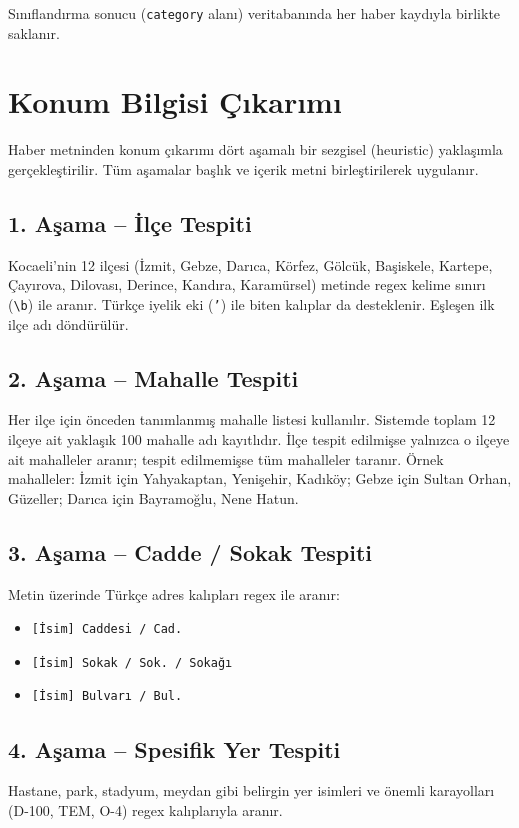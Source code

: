 \documentclass[conference,a4paper]{IEEEtran}
\begin{document}
Sınıflandırma sonucu (\texttt{category} alanı) veritabanında her haber kaydıyla birlikte saklanır.

\section{Konum Bilgisi Çıkarımı}
\label{sec:location}
Haber metninden konum çıkarımı dört aşamalı bir sezgisel (heuristic) yaklaşımla gerçekleştirilir. Tüm aşamalar başlık ve içerik metni birleştirilerek uygulanır.

\subsection{1. Aşama -- İlçe Tespiti}
Kocaeli'nin 12 ilçesi (İzmit, Gebze, Darıca, Körfez, Gölcük, Başiskele, Kartepe, Çayırova, Dilovası, Derince, Kandıra, Karamürsel) metinde regex kelime sınırı (\verb|\b|) ile aranır. Türkçe iyelik eki (\texttt{'}) ile biten kalıplar da desteklenir. Eşleşen ilk ilçe adı döndürülür.

\subsection{2. Aşama -- Mahalle Tespiti}
Her ilçe için önceden tanımlanmış mahalle listesi kullanılır. Sistemde toplam 12 ilçeye ait yaklaşık 100 mahalle adı kayıtlıdır. İlçe tespit edilmişse yalnızca o ilçeye ait mahalleler aranır; tespit edilmemişse tüm mahalleler taranır. Örnek mahalleler: İzmit için Yahyakaptan, Yenişehir, Kadıköy; Gebze için Sultan Orhan, Güzeller; Darıca için Bayramoğlu, Nene Hatun.

\subsection{3. Aşama -- Cadde / Sokak Tespiti}
Metin üzerinde Türkçe adres kalıpları regex ile aranır:
\begin{itemize}
    \item \texttt{[İsim] Caddesi / Cad.}
    \item \texttt{[İsim] Sokak / Sok. / Sokağı}
    \item \texttt{[İsim] Bulvarı / Bul.}
\end{itemize}

\subsection{4. Aşama -- Spesifik Yer Tespiti}
Hastane, park, stadyum, meydan gibi belirgin yer isimleri ve önemli karayolları (D-100, TEM, O-4) regex kalıplarıyla aranır.
\end{document}

